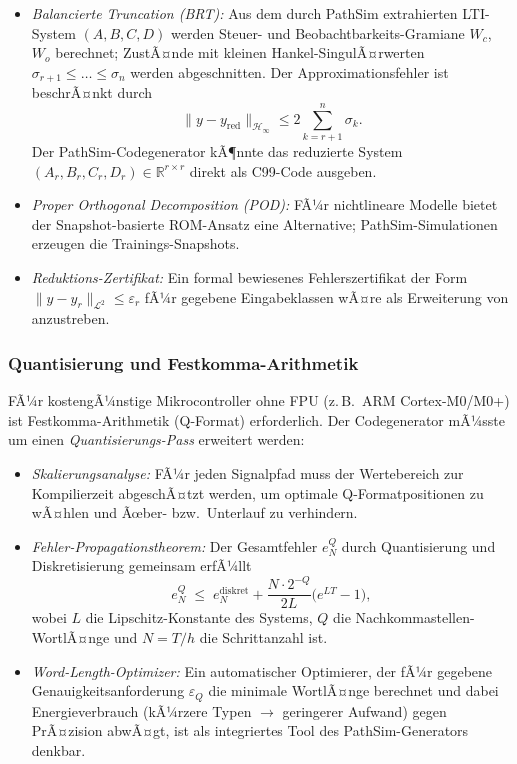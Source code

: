 ﻿\documentclass[12pt,a4paper]{article}
\theoremstyle{definition}
\begin{document}
\begin{itemize}
  \item \emph{Balancierte Truncation (BRT):} Aus dem durch PathSim
        extrahierten LTI-System $(A, B, C, D)$ werden Steuer- und
        Beobachtbarkeits-Gramiane $W_c$, $W_o$ berechnet; ZustÃ¤nde mit
        kleinen Hankel-SingulÃ¤rwerten $\sigma_{r+1} \leq \ldots \leq
        \sigma_n$ werden abgeschnitten. Der Approximationsfehler ist
        beschrÃ¤nkt durch
        \[
          \|y - y_{\mathrm{red}}\|_{\mathcal{H}_\infty}
          \leq 2\sum_{k=r+1}^n \sigma_k.
        \]
        Der PathSim-Codegenerator kÃ¶nnte das reduzierte System
        $(A_r, B_r, C_r, D_r) \in \mathbb{R}^{r \times r}$ direkt als
        C99-Code ausgeben.

  \item \emph{Proper Orthogonal Decomposition (POD):} FÃ¼r nichtlineare
        Modelle bietet der Snapshot-basierte ROM-Ansatz eine Alternative;
        PathSim-Simulationen erzeugen die Trainings-Snapshots.

  \item \emph{Reduktions-Zertifikat:} Ein formal bewiesenes
        Fehlerszertifikat der Form $\|y - y_r\|_{\mathcal{L}^2} \leq
        \varepsilon_r$ fÃ¼r gegebene Eingabeklassen wÃ¤re als
        Erweiterung von  anzustreben.
\end{itemize}

\subsubsection{Quantisierung und Festkomma-Arithmetik}

FÃ¼r kostengÃ¼nstige Mikrocontroller ohne FPU (z.\,B.\ ARM Cortex-M0/M0+)
ist Festkomma-Arithmetik (Q-Format) erforderlich. Der Codegenerator
mÃ¼sste um einen \emph{Quantisierungs-Pass} erweitert werden:

\begin{itemize}
  \item \emph{Skalierungsanalyse:} FÃ¼r jeden Signalpfad muss der
        Wertebereich zur Kompilierzeit abgeschÃ¤tzt werden, um optimale
        Q-Formatpositionen zu wÃ¤hlen und Ãœber- bzw.\ Unterlauf zu
        verhindern.

  \item \emph{Fehler-Propagationstheorem:} Der Gesamtfehler
        $e_N^Q$ durch Quantisierung und Diskretisierung gemeinsam erfÃ¼llt
        \[
          e_N^Q \;\leq\; e_N^{\mathrm{diskret}}
          + \frac{N \cdot 2^{-Q}}{2L}\bigl(e^{LT}-1\bigr),
        \]
        wobei $L$ die Lipschitz-Konstante des Systems, $Q$ die
        Nachkommastellen-WortlÃ¤nge und $N = T/h$ die Schrittanzahl ist.

  \item \emph{Word-Length-Optimizer:} Ein automatischer Optimierer, der
        fÃ¼r gegebene Genauigkeitsanforderung $\varepsilon_Q$ die minimale
        WortlÃ¤nge berechnet und dabei Energieverbrauch (kÃ¼rzere Typen
        $\to$ geringerer Aufwand) gegen PrÃ¤zision abwÃ¤gt, ist als
        integriertes Tool des PathSim-Generators denkbar.
\end{itemize}
\end{document}
